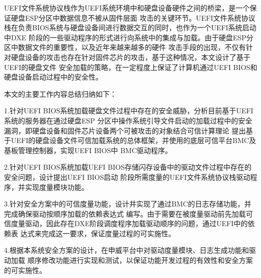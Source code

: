 \begin{APP}
UEFI文件系统协议栈作为UEFI系统环境中和硬盘设备硬件之间的桥梁，是一个保证硬盘ESP分区中数据信息不被从固件层面
攻击的关键环节。UEFI文件系统协议栈在负责BIOS系统与硬盘设备间进行数据交互的同时，也作为一个UEFI系统启动中DXE
阶段的一些驱动程序的形式进行向系统中的集成与加载。由于硬盘ESP分区中数据文件的重要性，以及近年来越来越多的硬件
攻击手段的出现，不仅有针对硬盘设备的攻击也存在针对固件芯片的攻击，基于这种情况，本文设计了基于UEFI的硬盘文件
安全加载的策略，在一定程度上保证了计算机通过UEFI BIOS和硬盘设备启动过程中的安全性。
\par 本文的主要工作内容总结归纳如下：
\par 1.针对UEFI BIOS系统加载硬盘文件过程中存在的安全威胁，分析目前基于UEFI系统的服务器在通过硬盘ESP
分区中操作系统引导文件启动的加载过程中的安全漏洞，即硬盘设备和固件芯片设备两个可被攻击的对象结合可信计算理论
提出基于UEFI的硬盘设备文件可信加载系统的总体框架，并使用的底层可信平台BMC及基板管理控制器，实现UEFI BIOS中
BMC驱动程序。
\par 2.针对UEFI BIOS系统加载UEFI BIOS存储闪存设备中的驱动文件过程中存在的安全问题，设计提出UEFI BIOS启动
阶段所需度量的UEFI文件系统协议栈驱动程序，并实现度量模块功能。
\par 3.针对安全方案中的可信度量功能，设计并实现了通过BMC的日志存储功能，并完成确保驱动按顺序加载的依赖表达式
编写。由于需要在被度量驱动前先加载可信度量驱动，因此存在DXE阶段调度程序加载驱动顺序的问题，通过UEFI中的依赖表
达式来完成这一要求，保证度量过程的可实施性。
\par 4.根据本系统安全方案的设计，在申威平台中对驱动度量模块、日志生成功能和驱动加载
顺序修改功能进行实现和测试，以保证功能开发过程的有效性和安全方案的可实施性。

\end{APP}

